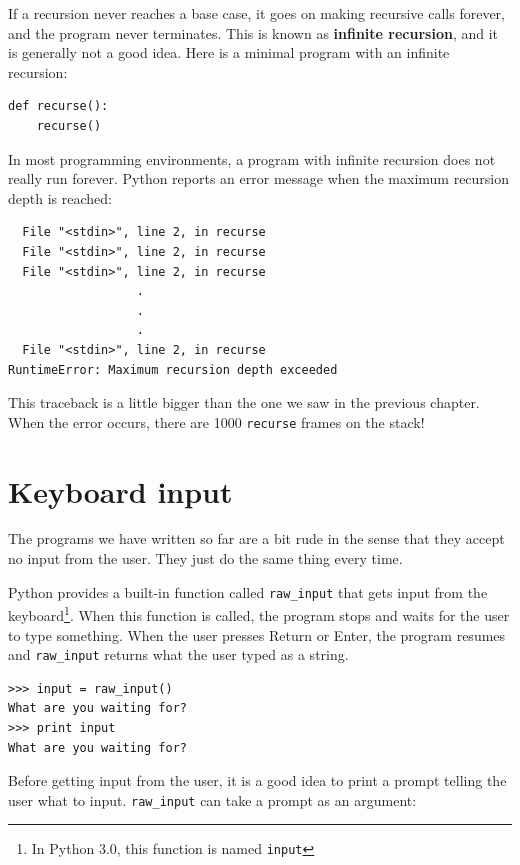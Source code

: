 \documentclass[10pt]{book}
\begin{document}
If a recursion never reaches a base case, it goes on making
recursive calls forever, and the program never terminates.  This is
known as {\bf infinite recursion}, and it is generally not
a good idea.  Here is a minimal program with an infinite recursion:

\beforeverb
\begin{verbatim}
def recurse():
    recurse()
\end{verbatim}
\afterverb
%
In most programming environments, a program with infinite recursion
does not really run forever.  Python reports an error
message when the maximum recursion depth is reached:


\beforeverb
\begin{verbatim}
  File "<stdin>", line 2, in recurse
  File "<stdin>", line 2, in recurse
  File "<stdin>", line 2, in recurse
                  .   
                  .
                  .
  File "<stdin>", line 2, in recurse
RuntimeError: Maximum recursion depth exceeded
\end{verbatim}
\afterverb
%
This traceback is a little bigger than the one we saw in the
previous chapter.  When the error occurs, there are 1000
{\tt recurse} frames on the stack!


\section{Keyboard input}

The programs we have written so far are a bit rude in the sense that
they accept no input from the user.  They just do the same thing every
time.

Python provides a built-in function called \verb"raw_input" that gets
input from the keyboard\footnote{In Python 3.0, this function is named
  {\tt input}}.  When this function is called, the program stops and
waits for the user to type something.  When the user presses {\sf
  Return} or {\sf Enter}, the program resumes and \verb"raw_input"
returns what the user typed as a string.


\beforeverb
\begin{verbatim}
>>> input = raw_input()
What are you waiting for?
>>> print input
What are you waiting for?
\end{verbatim}
\afterverb
%
Before getting input from the user, it is a good idea to print a
prompt telling the user what to input.  \verb"raw_input" can take a
prompt as an argument:
\end{document}
